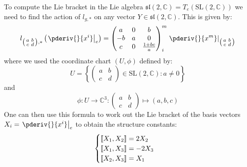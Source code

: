         \begin{example}
        	To compute the Lie bracket in the Lie algebra $\mathfrak{sl}(2, \mathbb{C}) = T_e(\text{SL}(2, \mathbb{C}))$ we need to find the action of $l_{g, *}$ on any vector $Y\in\mathfrak{sl}(2, \mathbb{C})$. This is given by:
        	\begin{equation}
        		l_{\left(\begin{smallmatrix}a&b\\c&d\end{smallmatrix}\right), *}\left(\left.\pderiv{}{x^i}\right|_e\right)
        		= \left(\begin{matrix}a&0&b\\-b&a&0\\c&0&\frac{1+bc}{a}\end{matrix}\right)^m_i\left.\pderiv{}{x^m}\right|_{\left(\begin{smallmatrix}a&b\\c&d\end{smallmatrix}\right)}
        	\end{equation}
        	where we used the coordinate chart $(U, \phi)$ defined by: \[U = \left\{\left(\begin{matrix}a&b\\c&d\end{matrix}\right)\in\text{SL}(2, \mathbb{C}): a\neq0\right\}\] and \[\phi:U\rightarrow\mathbb{C}^3:\left(\begin{matrix}a&b\\c&d\end{matrix}\right)\mapsto(a, b, c)\]
        	One can then use this formula to work out the Lie bracket of the basis vectors $X_i = \left.\pderiv{}{x^i}\right|_e$ to obtain the structure constants:
        	\begin{equation}
        		\label{lie:sl2c_lie_brackets}
        		\begin{cases}
        			\text{\textlbrackdbl}X_1, X_2\text{\textrbrackdbl} = 2X_2\\
        			\text{\textlbrackdbl}X_1, X_3\text{\textrbrackdbl} = -2X_3\\
        			\text{\textlbrackdbl}X_2, X_3\text{\textrbrackdbl} = X_1
        		\end{cases}
        	\end{equation}
        \end{example}

